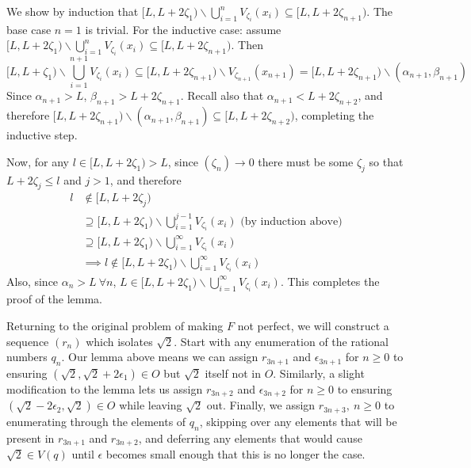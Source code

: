 \begin{solution}
{  We show by induction that \([L, L + 2\zeta_1) \backslash \bigcup^n_{i=1} V_{\zeta_i} (x_i) \subseteq [L, L + 2 \zeta_{n + 1})\). The base case \(n = 1\) is trivial. For the inductive case: assume \([L, L + 2\zeta_1) \backslash \bigcup^n_{i=1} V_{\zeta_i} (x_i) \subseteq [L, L + 2 \zeta_{n + 1})\). Then
  \[[L, L + \zeta_1) \backslash \bigcup^{n+1}_{i=1} V_{\zeta_i} (x_i) \subseteq [L, L + 2\zeta_{n+1}) \backslash V_{\zeta_{n+1}}(x_{n+1}) = [L, L + 2\zeta_{n+1}) \backslash (\alpha_{n+1}, \beta_{n+1})\]
  Since \(\alpha_{n+1} > L\), \(\beta_{n+1} > L + 2 \zeta_{n+1}\). Recall also that \(\alpha_{n+1} < L + 2 \zeta_{n+2}\), and therefore \([L, L + 2\zeta_{n+1}) \backslash (\alpha_{n+1}, \beta_{n+1}) \subseteq [L, L + 2 \zeta_{n+2})\), completing the inductive step.

  Now, for any \(l \in [L, L + 2 \zeta_1) > L\), since \((\zeta_n) \to 0\) there must be some \(\zeta_j\) so that \(L + 2 \zeta_j \leq l\) and \(j > 1\), and therefore
  \[
    \begin{aligned}
    l &\notin [L, L + 2 \zeta_j) \\
    & \supseteq [L, L + 2 \zeta_1) \backslash \bigcup^{j - 1}_{i=1} V_{\zeta_i} (x_i) \text{ (by induction above)}\\
    & \supseteq [L, L + 2\zeta_1) \backslash \bigcup^\infty_{i=1}V_{\zeta_i} (x_i) \\
    & \implies l \notin [L, L + 2\zeta_1) \backslash \bigcup^\infty_{i=1}V_{\zeta_i} (x_i)
    \end{aligned}
    \]
Also, since \(\alpha_n > L \  \forall n\), \(L \in [L, L + 2\zeta_1) \backslash \bigcup^\infty_{i=1}V_{\zeta_i} (x_i)\). This completes the proof of the lemma.

  Returning to the original problem of making \(F\) not perfect, we will construct a sequence \((r_n)\) which isolates \(\sqrt{2}\). Start with any enumeration of the rational numbers \(q_n\). Our lemma above means we can assign \(r_{3n + 1}\) and \(\epsilon_{3n + 1}\) for \(n \geq 0\) to ensuring \((\sqrt{2}, \sqrt{2} + 2\epsilon_1) \in O\) but \(\sqrt{2}\) itself not in \(O\). Similarly, a slight modification to the lemma lets us assign \(r_{3n + 2}\) and \(\epsilon_{3n + 2}\) for \(n \geq 0\) to ensuring \((\sqrt{2} - 2 \epsilon_2, \sqrt{2}) \in O\) while leaving \(\sqrt{2}\) out. Finally, we assign \(r_{3n+3},\ n \geq 0\) to enumerating through the elements of \(q_n\), skipping over any elements that will be present in \(r_{3n + 1}\) and \(r_{3n + 2}\), and deferring any elements that would cause \(\sqrt{2} \in V(q)\) until \(\epsilon\) becomes small enough that this is no longer the case.

}
\end{solution}
